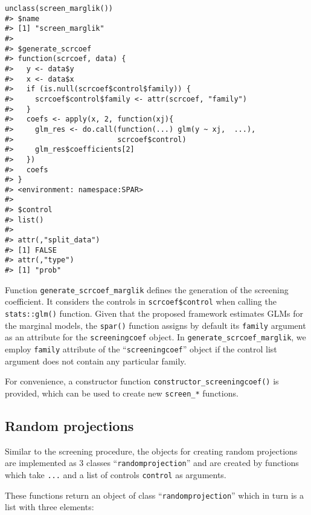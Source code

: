 \documentclass[
  article]{jss}
\begin{document}
\begin{verbatim}
unclass(screen_marglik())
#> $name
#> [1] "screen_marglik"
#> 
#> $generate_scrcoef
#> function(scrcoef, data) {
#>   y <- data$y
#>   x <- data$x
#>   if (is.null(scrcoef$control$family)) {
#>     scrcoef$control$family <- attr(scrcoef, "family")
#>   }
#>   coefs <- apply(x, 2, function(xj){
#>     glm_res <- do.call(function(...) glm(y ~ xj,  ...),
#>                        scrcoef$control)
#>     glm_res$coefficients[2]
#>   })
#>   coefs
#> }
#> <environment: namespace:SPAR>
#> 
#> $control
#> list()
#> 
#> attr(,"split_data")
#> [1] FALSE
#> attr(,"type")
#> [1] "prob"
\end{verbatim}

Function \texttt{generate\_scrcoef\_marglik} defines the generation of
the screening coefficient. It considers the controls in
\texttt{scrcoef\$control} when calling the \texttt{stats::glm()}
function. Given that the proposed framework estimates GLMs for the
marginal models, the \texttt{spar()} function assigns by default its
\texttt{family} argument as an attribute for the \texttt{screeningcoef}
object. In \texttt{generate\_scrcoef\_marglik}, we employ
\texttt{family} attribute of the ``\texttt{screeningcoef}'' object if
the control list argument does not contain any particular family.

For convenience, a constructor function
\texttt{constructor\_screeningcoef()} is provided, which can be used to
create new \texttt{screen\_*} functions.

\subsection{Random projections}\label{random-projections}

Similar to the screening procedure, the objects for creating random
projections are implemented as 3 classes
``\texttt{randomprojection}'' and are created by functions which take
\texttt{...} and a list of controls \texttt{control} as arguments.

These functions return an object of class ``\texttt{randomprojection}''
which in turn is a list with three elements:
\end{document}
